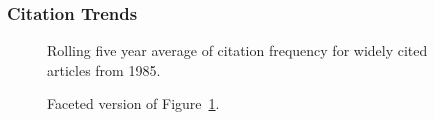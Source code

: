 \documentclass[
  10pt,
  letterpaper,
  DIV=11,
  numbers=noendperiod,
  twoside]{scrartcl}
\begin{document}
\subsubsection*{Citation Trends}\label{citation-trends-9}

\begin{figure}


\caption{\label{fig-citation-spaghetti-1985}Rolling five year average of
citation frequency for widely cited articles from 1985.}

\end{figure}%

\begin{figure}


\caption{\label{fig-citation-facet-1985}Faceted version of
Figure~\ref{fig-citation-spaghetti-1985}.}

\end{figure}%
\end{document}
